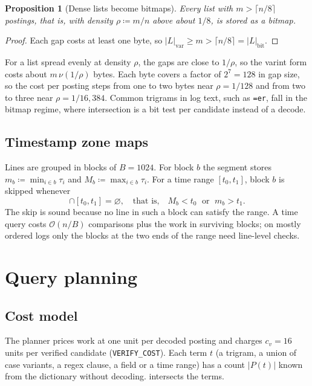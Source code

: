 \documentclass[11pt]{article}
\theoremstyle{plain}
\newtheorem{proposition}[theorem]{Proposition}
\theoremstyle{definition}
\theoremstyle{remark}
\newcommand{\code}[1]{\texttt{#1}}
\newcommand{\abs}[1]{\left\lvert #1 \right\rvert}
\newcommand{\bigO}[1]{\mathcal{O}\!\left(#1\right)}
\begin{document}
\begin{proposition}[Dense lists become bitmaps]\label{prop:bitmap}
Every list with $m > \lceil n/8 \rceil$ postings, that is, with density
$\rho \coloneqq m/n$ above about $1/8$, is stored as a bitmap.
\end{proposition}

\begin{proof}
Each gap costs at least one byte, so $\abs{L}_{\text{var}} \ge m > \lceil n/8
\rceil = \abs{L}_{\text{bit}}$.
\end{proof}

For a list spread evenly at density $\rho$, the gaps are close to $1/\rho$, so
the varint form costs about $m\,\nu(1/\rho)$ bytes. Each byte covers a factor of
$2^7 = 128$ in gap size, so the cost per posting steps from one to two bytes near
$\rho = 1/128$ and from two to three near $\rho = 1/16{,}384$. Common trigrams in
log text, such as \code{=er}, fall in the bitmap regime, where intersection is a
bit test per candidate instead of a decode.

\subsection{Timestamp zone maps}

Lines are grouped in blocks of $B = 1024$. For block $b$ the segment stores
$m_b \coloneqq \min_{i \in b}\tau_i$ and $M_b \coloneqq \max_{i \in b}\tau_i$.
For a time range $[t_0, t_1]$, block $b$ is skipped whenever
\begin{equation}
  [m_b, M_b] \cap [t_0, t_1] = \varnothing, \quad\text{that is,}\quad M_b < t_0 \;\text{ or }\; m_b > t_1 .
\end{equation}
The skip is sound because no line in such a block can satisfy the range. A time
query costs $\bigO{n/B}$ comparisons plus the work in surviving blocks; on mostly
ordered logs only the blocks at the two ends of the range need line-level checks.

\section{Query planning}\label{sec:planning}

\subsection{Cost model}

The planner prices work at one unit per decoded posting and charges
$c_v = 16$ units per verified candidate (\code{VERIFY\_COST}). Each term $t$ (a
trigram, a union of case variants, a regex clause, a field or a time range) has a
count $\abs{P(t)}$ known from the dictionary without decoding.
 intersects the terms.
\end{document}
